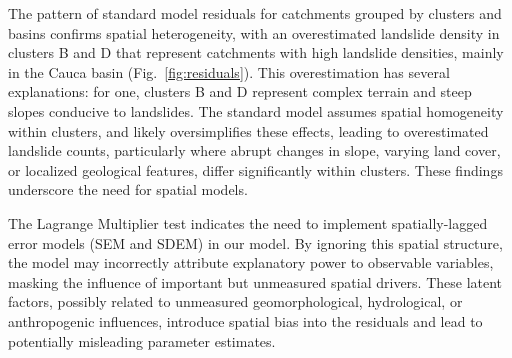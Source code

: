 \documentclass[lineno,pdflatex,sn-basic]{sn-jnl}%
\theoremstyle{thmstyleone}%
\theoremstyle{thmstyletwo}%
\theoremstyle{thmstylethree}%
\begin{document}
The pattern of standard model residuals for catchments grouped by clusters and basins confirms spatial heterogeneity, with an overestimated landslide density in clusters B and D that represent catchments with high landslide densities, mainly in the Cauca basin (Fig.~\ref{fig:residuals}).
This overestimation has several explanations: 
for one, clusters B and D represent complex terrain and steep slopes conducive to landslides. The standard model assumes spatial homogeneity within clusters, and likely oversimplifies these effects, leading to overestimated landslide counts, particularly where abrupt changes in slope, varying land cover, or localized geological features, differ significantly within clusters.
These findings underscore the need for spatial models.

The Lagrange Multiplier test indicates the need to implement spatially-lagged error models (SEM and SDEM) in our model. 
By ignoring this spatial structure, the model may incorrectly attribute explanatory power to observable variables, masking the influence of important but unmeasured spatial drivers. 
These latent factors, possibly related to unmeasured geomorphological, hydrological, or anthropogenic influences, introduce spatial bias into the residuals and lead to potentially misleading parameter estimates.
\end{document}
